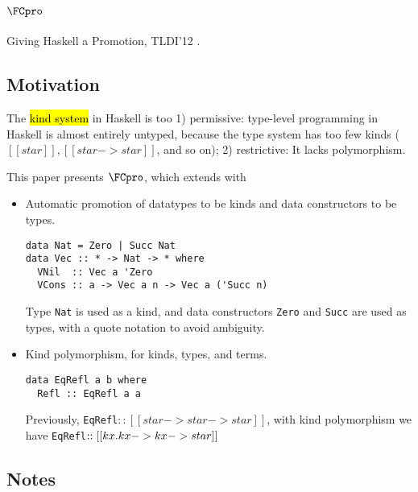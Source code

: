 \section{$\FCpro$}
\label{sec:fcpro}

Giving Haskell a Promotion, TLDI'12 \citep{yorgey2012giving}.

\subsection{Motivation}

The \hl{kind system} in Haskell is too 1) permissive: type-level programming in
Haskell is almost entirely untyped, because the type system has too few kinds
($[[ star ]], [[ star -> star ]]$, and so on); 2) restrictive: It lacks
polymorphism.

This paper presents $\FCpro$, which extends \FC with
\begin{itemize}
\item Automatic promotion of datatypes to be kinds and data constructors to be
  types.
\begin{verbatim}
data Nat = Zero | Succ Nat
data Vec :: * -> Nat -> * where
  VNil  :: Vec a 'Zero
  VCons :: a -> Vec a n -> Vec a ('Succ n)
\end{verbatim}

Type \texttt{Nat} is used as a kind, and data constructors \texttt{Zero} and
\texttt{Succ} are used as types, with a quote notation to avoid ambiguity.

\item Kind polymorphism, for kinds, types, and terms.

\begin{verbatim}
data EqRefl a b where
  Refl :: EqRefl a a
\end{verbatim}

Previously, \verb|EqRefl|$:: [[star -> star -> star]]$, with kind polymorphism
we have \verb|EqRefl|$:: [[ \/ kx . kx -> kx -> star ]]$
  
\end{itemize}

\subsection{Notes}

